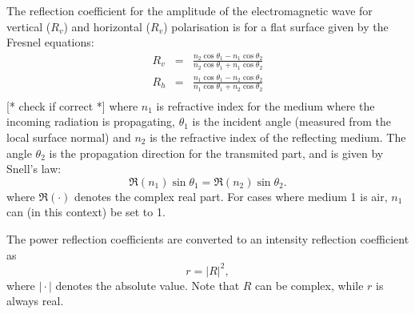  The reflection coefficient for the amplitude of the electromagnetic
 wave for vertical ($R_v$) and horizontal ($R_v$) polarisation is
 for a flat surface given by the Fresnel equations:
 \begin{eqnarray}
   \label{eq:rte_fresnel}
   R_v &=& \frac{n_2\cos\theta_1-n_1\cos\theta_2}
                                           {n_2\cos\theta_1+n_1\cos\theta_2} \\
   R_h &=& \frac{n_1\cos\theta_1-n_2\cos\theta_2}
                                           {n_1\cos\theta_1+n_2\cos\theta_2} \\
 \end{eqnarray}
 [* check if correct *] where $n_1$ is refractive index for
 the medium where the incoming radiation is propagating, $\theta_1$ is
 the incident angle (measured from the local surface normal) and $n_2$
 is the refractive index of the reflecting medium. The angle
 $\theta_2$ is the propagation direction for the transmited part, and
 is given by Snell's law:
 \begin{equation}
   \label{eq:rte:snell}
   \Re(n_1)\sin\theta_1 = \Re(n_2)\sin\theta_2.
 \end{equation}
 where $\Re(\cdot)$ denotes the complex real part.
 For cases where medium 1 is air, $n_1$ can (in this context) be set to 1.
 
 The power reflection coefficients are converted to an intensity
 reflection coefficient as
 \begin{equation}
   \label{eq:rte:R2r}
   r = |R|^2,
 \end{equation}
 where $|\!\cdot\!|$ denotes the absolute value. Note that $R$ can be
 complex, while $r$ is always real.
 
